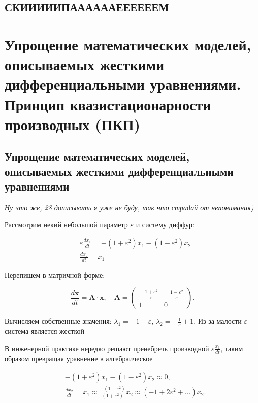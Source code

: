 	\subsection{СКИИИИИПААААААЕЕЕЕЕЕМ}
	
	\newpage
	
	\section{Упрощение математических моделей, описываемых жесткими дифференциальными уравнениями. Принцип квазистационарности производных (ПКП)}
	
	\subsection{Упрощение математических моделей, описываемых жесткими дифференциальными уравнениями}
	
	\textit{Ну что же, 28 дописывать я уже не буду, так что страдай от непонимания)}
	
	Рассмотрим некий небольшой параметр $\varepsilon$ и систему диффур:
	
	\begin{align}
		&\varepsilon \frac{dx_1}{dt} = -\left(1 + \varepsilon^2\right)x_1 - \left(1 - \varepsilon^2\right)x_2 \\
		&\frac{dx_2}{dt} = x_1
	\end{align}
	
	Перепишем в матричной форме:
	
	\begin{equation}
		\frac{d\mathbf{x}}{dt} = \mathbf{A} \cdot \mathbf{x}, \quad
		\mathbf{A} = 
		\begin{pmatrix}
			-\frac{1 + \varepsilon^2}{\varepsilon} & -\frac{1 - \varepsilon^2}{\varepsilon} \\
			1 & 0
		\end{pmatrix}.
	\end{equation}
	
	Вычисляем собственные значения: $\lambda_1 = -1 - \varepsilon$, $\lambda_2 = - \frac 1 \varepsilon + 1$. Из-за малости $\varepsilon$ система является жесткой
	
	В инженерной практике нередко решают пренебречь производной $\varepsilon \frac {x_1}{dt}$, таким образом превращая уравнение в алгебраическое
	
	\begin{align}
		&-(1+\varepsilon^2)x_1 - (1-\varepsilon^2)x_2 \approx 0, \\
		&\frac{dx_2}{dt} = x_1 \approx \frac{-(1-\varepsilon^2)}{(1+\varepsilon^2)}x_2 \approx (-1 + 2\varepsilon^2 + \dots)x_2.
	\end{align}
	
